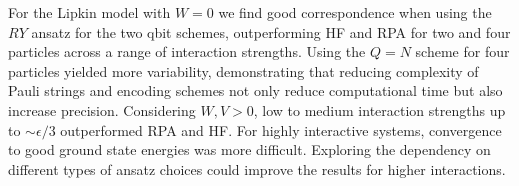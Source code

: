 
For the Lipkin model with $W=0$ we find good correspondence when using the $RY$ ansatz for the two qbit schemes, outperforming HF and RPA for two and four particles across a range of interaction strengths. Using the $Q = N$ scheme for four particles yielded more variability, demonstrating that reducing complexity of Pauli strings and encoding schemes not only reduce computational time but also increase precision. Considering $W, V > 0$, low to medium interaction strengths up to $\sim \epsilon/3$ outperformed RPA and HF. For highly interactive systems, convergence to good ground state energies was more difficult. Exploring the dependency on different types of ansatz choices could improve the results for higher interactions.